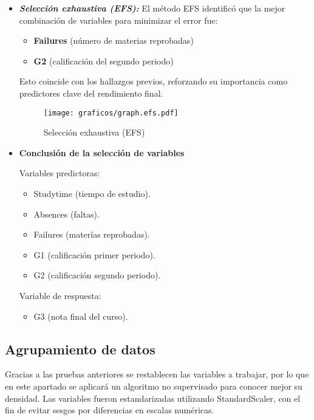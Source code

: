 \documentclass{article}
\begin{document}
\begin{itemize}[label=\textendash]
\item {\textbf{\textit{Selección exhaustiva (EFS):}}}
El método EFS identificó que la mejor combinación de variables para minimizar el error fue:
    \begin{itemize}[label=\--]
    \item \textbf{Failures} (número de materias reprobadas)
    \item \textbf{G2} (calificación del segundo periodo)
    \end{itemize}

Esto coincide con los hallazgos previos, reforzando su importancia como predictores clave del rendimiento final.

\begin{figure}[H]
    \centering
    \texttt{[image: graficos/graph.efs.pdf]}
    \caption{\small Selección exhaustiva (EFS)}
    \label{fig:efs}
\end{figure}

\item {\textbf{Conclusión de la selección de variables}}


Variables predictoras:
    \begin{itemize}[label=\--]
    \item Studytime (tiempo de estudio).
    \item Absences (faltas).
    \item Failures (materías reprobadas).
    \item G1 (calificación primer periodo).
    \item G2 (calificación segundo periodo).
    \end{itemize}
Variable de respuesta:
    \begin{itemize}[label=\--]
    \item G3 (nota final del curso).
    \end{itemize}
  
\end{itemize}

\subsection*{Agrupamiento de datos}

Gracias a las pruebas anteriores se restablecen las variables a trabajar, por lo que en este apartado se aplicará un algoritmo no supervisado para conocer mejor su densidad. Las variables fueron estandarizadas utilizando StandardScaler, con el fin de evitar sesgos por diferencias en escalas numéricas.
\end{document}
